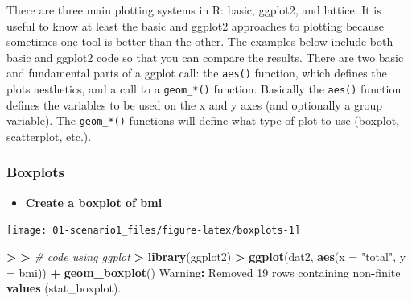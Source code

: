 \documentclass[
]{book}
\newenvironment{Shaded}{\begin{snugshade}}{\end{snugshade}}
\newcommand{\CommentTok}[1]{\textcolor[rgb]{0.56,0.35,0.01}{\textit{#1}}}
\newcommand{\DataTypeTok}[1]{\textcolor[rgb]{0.13,0.29,0.53}{#1}}
\newcommand{\DecValTok}[1]{\textcolor[rgb]{0.00,0.00,0.81}{#1}}
\newcommand{\ErrorTok}[1]{\textcolor[rgb]{0.64,0.00,0.00}{\textbf{#1}}}
\newcommand{\KeywordTok}[1]{\textcolor[rgb]{0.13,0.29,0.53}{\textbf{#1}}}
\newcommand{\NormalTok}[1]{#1}
\newcommand{\OperatorTok}[1]{\textcolor[rgb]{0.81,0.36,0.00}{\textbf{#1}}}
\newcommand{\StringTok}[1]{\textcolor[rgb]{0.31,0.60,0.02}{#1}}
\providecommand{\tightlist}{%
  \setlength{\itemsep}{0pt}\setlength{\parskip}{0pt}}
\begin{document}
There are three main plotting systems in R: basic, ggplot2, and lattice.
It is useful to know at least the basic and ggplot2 approaches to plotting because sometimes one tool is better than the other.
The examples below include both basic and ggplot2 code so that you can compare the results.
There are two basic and fundamental parts of a ggplot call:
the \texttt{aes()} function, which defines the plots aesthetics, and a call to a \texttt{geom\_*()} function.
Basically the \texttt{aes()} function defines the variables to be used on the x and y axes (and optionally a group variable).
The \texttt{geom\_*()} functions will define what type of plot to use (boxplot, scatterplot, etc.).

\hypertarget{boxplots}{%
\subsubsection{Boxplots}\label{boxplots}}

\begin{itemize}
\tightlist
\item
  \textbf{Create a boxplot of bmi}
\end{itemize}

\begin{Shaded}
\end{Shaded}

\begin{center}\texttt{[image: 01-scenario1\_files/figure-latex/boxplots-1]} \end{center}

\begin{Shaded}
\begin{Highlighting}[]
\OperatorTok{>}\StringTok{ }
\ErrorTok{>}\StringTok{ }\CommentTok{# code using ggplot}
\ErrorTok{>}\StringTok{ }\KeywordTok{library}\NormalTok{(ggplot2)}
\OperatorTok{>}\StringTok{ }\KeywordTok{ggplot}\NormalTok{(dat2, }\KeywordTok{aes}\NormalTok{(}\DataTypeTok{x =} \StringTok{"total"}\NormalTok{, }\DataTypeTok{y =}\NormalTok{ bmi)) }\OperatorTok{+}\StringTok{ }\KeywordTok{geom_boxplot}\NormalTok{()}
\NormalTok{Warning}\OperatorTok{:}\StringTok{ }\NormalTok{Removed }\DecValTok{19}\NormalTok{ rows containing non}\OperatorTok{-}\NormalTok{finite }\KeywordTok{values}\NormalTok{ (stat_boxplot).}
\end{Highlighting}
\end{Shaded}
\end{document}
